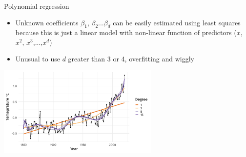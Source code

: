\documentclass[english]{beamer}
\newcommand{\alertblue}[1]{{\color{blue}#1}}
\begin{document}
\begin{frame}{Polynomial regression}
    \begin{itemize}
        \item \alertblue{Unknown coefficients $\beta_1$, $\beta_2$...$\beta_d$} can be easily estimated using least squares because this is just a \alertblue{linear model with non-linear function of predictors} (\(x\), \(x^2\), \(x^3\),...,\(x^d\))
        \item Unusual to use \(d\) greater than \alertblue{3 or 4}, \alert{overfitting and wiggly} 
    \end{itemize}
    \centering
    \includegraphics[width=8cm,keepaspectratio]{images/overfit.jpg}
\end{frame}
\end{document}
